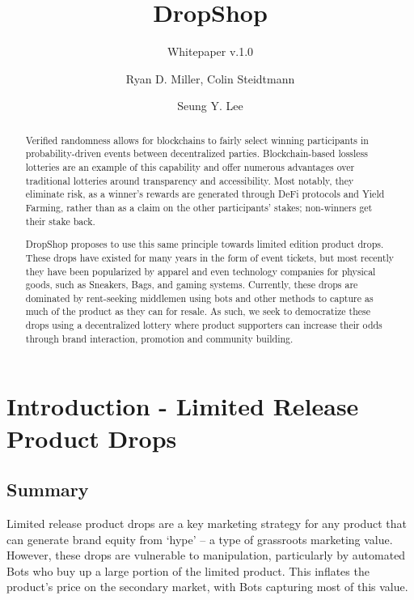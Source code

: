 \documentclass[runningheads]{llncs}
\begin{document}
%
\title{DropShop }%
\subtitle{Whitepaper v.1.0}
%
%
\author{Ryan D. Miller, Colin Steidtmann \and Seung Y. Lee}
%
%
%
\maketitle              %
%

\begin{abstract}
Verified randomness allows for blockchains to fairly select winning participants in probability-driven events between decentralized parties.  Blockchain-based lossless lotteries are an example of this capability and offer numerous advantages over traditional lotteries around transparency and accessibility.  Most notably, they eliminate risk, as a winner’s rewards are generated through DeFi protocols and Yield Farming, rather than as a claim on the other participants' stakes; non-winners get their stake back.


DropShop proposes to use this same principle towards limited edition product drops.  These drops have existed for many years in the form of event tickets, but most recently they have been popularized by apparel and even technology companies for physical goods, such as Sneakers, Bags, and gaming systems.  Currently, these drops are dominated by rent-seeking middlemen using bots and other methods to capture as much of the product as they can for resale.  As such, we seek to democratize these drops using a decentralized lottery where product supporters can increase their odds through brand interaction, promotion and community building.


\end{abstract}
%
%
%
\section{Introduction - Limited Release Product Drops}\label{intro-sec}

\subsection{Summary}
Limited release product drops are a key marketing strategy for any product that can generate brand equity from ‘hype’ – a type of grassroots marketing value.  However, these drops are vulnerable to manipulation, particularly by automated Bots who buy up a large portion of the limited product.  This inflates the product’s price on the secondary market, with Bots capturing most of this value.  
\end{document}
